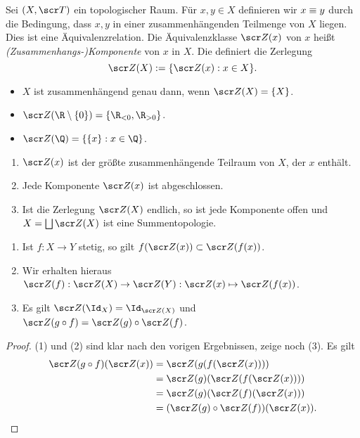 \begin{df}
	Sei $(X, \scr T)$ ein topologischer Raum.
	Für $x,y \in X$ definieren wir $x \equiv y$ durch die Bedingung, dass $x,y$ in einer zusammenhängenden Teilmenge von $X$ liegen.
	Dies ist eine Äquivalenzrelation.
	Die Äquivalenzklasse $\scr Z(x)$ von $x$ heißt \emph{(Zusammenhangs-)Komponente} von $x$ in $X$.
	Die definiert die Zerlegung
	\[
		\scr Z(X) := \{ \scr Z(x) : x \in X \}.
	\]
\end{df}

\begin{ex}
	\begin{itemize}
		\item
			$X$ ist zusammenhängend genau dann, wenn $\scr Z(X) = \{X\}$.
		\item
			$\scr Z(\R \setminus \{0\}) = \{ \R_{<0}, \R_{>0} \}$.
		\item
			$\scr Z(\Q) = \{ \{x\} : x \in \Q \}$.
	\end{itemize}
\end{ex}

\begin{st}
	\begin{enumerate}[(1)]
		\item
			$\scr Z(x)$ ist der größte zusammenhängende Teilraum von $X$, der $x$ enthält.
		\item
			Jede Komponente $\scr Z(x)$ ist abgeschlossen.
		\item
			Ist die Zerlegung $\scr Z(X)$ endlich, so ist jede Komponente offen und $X = \bigdunion \scr Z(X)$ ist eine Summentopologie.
	\end{enumerate}
\end{st}

\begin{st}
	\begin{enumerate}[(1)]
		\item
			Ist $f: X \to Y$ stetig, so gilt $f(\scr Z(x)) \subset \scr Z(f(x))$.
		\item
			Wir erhalten hieraus $\scr Z(f): \scr Z(X) \to \scr Z(Y): \scr Z(x) \mapsto \scr Z(f(x))$.
		\item
			Es gilt $\scr Z(\Id_X) = \Id_{\scr Z(X)}$ und $\scr Z(g\circ f) = \scr Z(g) \circ \scr Z(f)$.
	\end{enumerate}
	\begin{proof}
		(1) und (2) sind klar nach den vorigen Ergebnissen, zeige noch (3).
		Es gilt
		\begin{align*}
			\scr Z(g\circ f) (\scr Z(x))
			&= \scr Z(g(f(\scr Z(x)))) \\
			&= \scr Z(g) (\scr Z(f(\scr Z(x)))) \\
			&= \scr Z(g)(\scr Z(f)(\scr Z(x))) \\
			&= (\scr Z(g) \circ \scr Z(f)) (\scr Z(x)).
		\end{align*}
	\end{proof}
\end{st}


